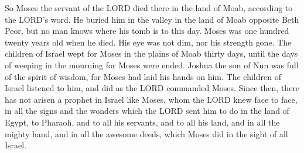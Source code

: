 \myverse{}So Moses the servant of the LORD died there in the land of Moab,
according to the LORD’s word.
\myverse{}He buried him in the valley in the land of Moab opposite Beth Peor, but no
man knows where his tomb is to this day.
\myverse{}Moses was one hundred twenty years old when he died. His eye was not dim, nor
his strength gone.
\myverse{}The children of Israel wept for Moses in the plains of Moab thirty days, until
the days of weeping in the mourning for Moses were ended.
\myverse{}Joshua the son of Nun was full of the spirit of wisdom, for Moses had laid
his hands on him. The children of Israel listened to him, and did as the LORD commanded Moses.
\myverse{}Since then, there has not arisen a prophet in Israel like Moses, whom the
LORD knew face to face,
\myverse{}in all the signs and the wonders which the LORD sent him to do in the land
of Egypt, to Pharaoh, and to all his servants, and to all his land,
\myverse{}and in all the mighty hand, and in all the awesome deeds, which Moses did
in the sight of all Israel.


